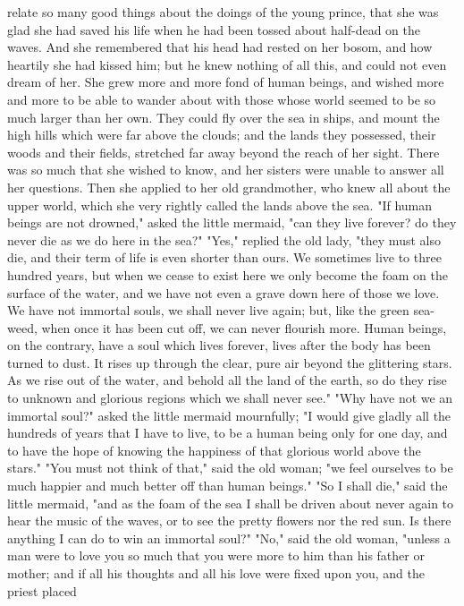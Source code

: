 relate so many good things about the doings of the young prince,
that she was glad she had saved his life when he had been tossed about
half-dead on the waves. And she remembered that his head had rested on
her bosom, and how heartily she had kissed him; but he knew nothing of
all this, and could not even dream of her. She grew more and more fond
of human beings, and wished more and more to be able to wander about
with those whose world seemed to be so much larger than her own.
They could fly over the sea in ships, and mount the high hills which
were far above the clouds; and the lands they possessed, their woods
and their fields, stretched far away beyond the reach of her sight.
There was so much that she wished to know, and her sisters were unable
to answer all her questions. Then she applied to her old
grandmother, who knew all about the upper world, which she very
rightly called the lands above the sea.
    "If human beings are not drowned," asked the little mermaid,
"can they live forever? do they never die as we do here in the sea?"
    "Yes," replied the old lady, "they must also die, and their term
of life is even shorter than ours. We sometimes live to three
hundred years, but when we cease to exist here we only become the foam
on the surface of the water, and we have not even a grave down here of
those we love. We have not immortal souls, we shall never live
again; but, like the green sea-weed, when once it has been cut off, we
can never flourish more. Human beings, on the contrary, have a soul
which lives forever, lives after the body has been turned to dust.
It rises up through the clear, pure air beyond the glittering stars.
As we rise out of the water, and behold all the land of the earth,
so do they rise to unknown and glorious regions which we shall never
see."
    "Why have not we an immortal soul?" asked the little mermaid
mournfully; "I would give gladly all the hundreds of years that I have
to live, to be a human being only for one day, and to have the hope of
knowing the happiness of that glorious world above the stars."
    "You must not think of that," said the old woman; "we feel
ourselves to be much happier and much better off than human beings."
    "So I shall die," said the little mermaid, "and as the foam of the
sea I shall be driven about never again to hear the music of the
waves, or to see the pretty flowers nor the red sun. Is there anything
I can do to win an immortal soul?"
    "No," said the old woman, "unless a man were to love you so much
that you were more to him than his father or mother; and if all his
thoughts and all his love were fixed upon you, and the priest placed
